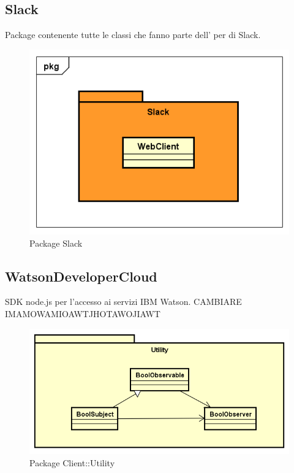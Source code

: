 \subsection{Slack}
Package contenente tutte le classi che fanno parte dell' per  di Slack.
\begin{figure}[h] \centering \includegraphics[width=\textwidth,height=\textheight,keepaspectratio]{images/diagrams/back-end/Official_Backend_0304/Slack.png}
\caption{Package Slack}
\end{figure}
\newpage

\subsection{WatsonDeveloperCloud}
SDK node.js per l'accesso ai servizi  IBM Watson. CAMBIARE IMAMOWAMIOAWTJHOTAWOJIAWT
\begin{figure}[h] \centering \includegraphics[width=\textwidth,height=\textheight,keepaspectratio]{images/diagrams/client/Client/Utility.png}
\caption{Package Client::Utility}
\end{figure}
\newpage
